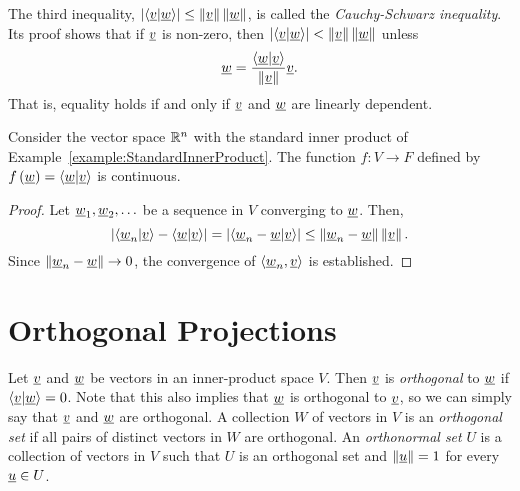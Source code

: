 The third inequality, $\left| \left\langle \underline{v} | \underline{w} \right\rangle \right| \leq \left\| \underline{v} \right\| \left\| \underline{w} \right\|$, is called the \emph{Cauchy-Schwarz inequality}.
Its proof shows that if $\underline{v}$ is non-zero, then $\left| \left\langle \underline{v} | \underline{w} \right\rangle \right| < \left\| \underline{v} \right\| \left\| \underline{w} \right\|$ unless
\begin{equation*}
\underline{w} = \frac{ \left\langle \underline{w} | \underline{v} \right\rangle }
{ \left\| \underline{v} \right\| } \underline{v} .
\end{equation*}
That is, equality holds if and only if $\underline{v}$ and $\underline{w}$ are linearly dependent.

\begin{theorem}
Consider the vector space $\mathbb{R}^n$ with the standard inner product of Example~\ref{example:StandardInnerProduct}.
The function $f: V \rightarrow F$ defined by $f \left( \underline{w} \right) = \left\langle \underline{w} | \underline{v} \right\rangle$ is continuous.
\end{theorem}
\begin{proof}
Let $\underline{w}_1, \underline{w}_2, \ldots$ be a sequence in $V$ converging to $\underline{w}$.
Then,
\begin{equation*}
\left| \left\langle \underline{w}_n | \underline{v} \right\rangle
- \left\langle \underline{w} | \underline{v} \right\rangle \right|
= \left| \left\langle \underline{w}_n - \underline{w} | \underline{v} \right\rangle \right|
\leq \left\| \underline{w}_n - \underline{w} \right\| \left\| \underline{v} \right\|.
\end{equation*}
Since $\left\| \underline{w}_n - \underline{w} \right\| \rightarrow 0$, the convergence of $\left\langle \underline{w}_n, \underline{v} \right\rangle$ is established.
\end{proof}


\section{Orthogonal Projections}

\begin{definition}
Let $\underline{v}$ and $\underline{w}$ be vectors in an inner-product space $V$.
Then $\underline{v}$ is \emph{orthogonal} to $\underline{w}$ if $\left\langle \underline{v} | \underline{w} \right\rangle = 0$.
Note that this also implies that $\underline{w}$ is orthogonal to $\underline{v}$, so we can simply say that $\underline{v}$ and $\underline{w}$ are orthogonal.
A collection $W$ of vectors in $V$ is an \emph{orthogonal set} if all pairs of distinct vectors in $W$ are orthogonal.
An \emph{orthonormal set} $U$ is a collection of vectors in $V$ such that $U$ is an orthogonal set and $\left\| \underline{u} \right\| = 1$ for every $\underline{u} \in U$.
\end{definition}


